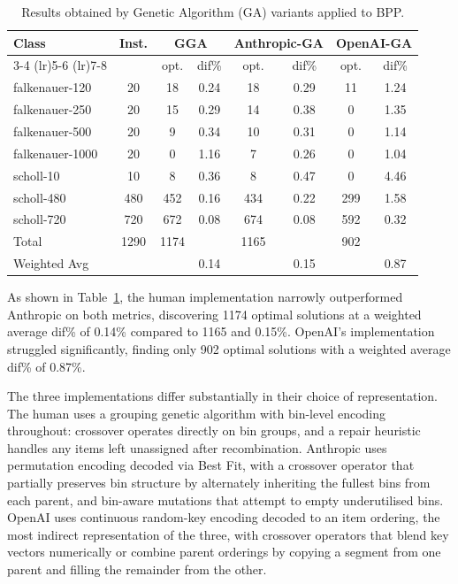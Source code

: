 \documentclass[11pt]{article}
\begin{document}
\begin{table}[H]
\centering
\caption{Results obtained by Genetic Algorithm (GA) variants applied to BPP.}
\label{tab:ga-comparison}
\begin{tabular}{l c cc cc cc}
\toprule
\multirow{2}{*}{Class} & \multirow{2}{*}{Inst.} & \multicolumn{2}{c}{GGA} & \multicolumn{2}{c}{Anthropic-GA} & \multicolumn{2}{c}{OpenAI-GA} \\
\cmidrule(lr){3-4} \cmidrule(lr){5-6} \cmidrule(lr){7-8}
 & & opt. & dif\% & opt. & dif\% & opt. & dif\% \\
\midrule
falkenauer-120  & 20   & 18   & 0.24 & 18   & 0.29 & 11   & 1.24 \\
falkenauer-250  & 20   & 15   & 0.29 & 14   & 0.38 & 0    & 1.35 \\
falkenauer-500  & 20   & 9    & 0.34 & 10   & 0.31 & 0    & 1.14 \\
falkenauer-1000 & 20   & 0    & 1.16 & 7    & 0.26 & 0    & 1.04 \\
scholl-10       & 10   & 8    & 0.36 & 8    & 0.47 & 0    & 4.46 \\
scholl-480      & 480  & 452  & 0.16 & 434  & 0.22 & 299  & 1.58 \\
scholl-720      & 720  & 672  & 0.08 & 674  & 0.08 & 592  & 0.32 \\
\midrule
Total           & 1290 & 1174 &      & 1165 &      & 902  &      \\
Weighted Avg    &      &      & 0.14 &      & 0.15 &      & 0.87 \\
\bottomrule
\end{tabular}
\end{table}

As shown in Table~\ref{tab:ga-comparison}, the human implementation narrowly outperformed Anthropic on both metrics, discovering 1174 optimal solutions at a weighted average dif\% of 0.14\% compared to 1165 and 0.15\%. OpenAI's implementation struggled significantly, finding only 902 optimal solutions with a weighted average dif\% of 0.87\%.

The three implementations differ substantially in their choice of representation. The human uses a grouping genetic algorithm with bin-level encoding throughout: crossover operates directly on bin groups, and a repair heuristic handles any items left unassigned after recombination. Anthropic uses permutation encoding decoded via Best Fit, with a crossover operator that partially preserves bin structure by alternately inheriting the fullest bins from each parent, and bin-aware mutations that attempt to empty underutilised bins. OpenAI uses continuous random-key encoding decoded to an item ordering, the most indirect representation of the three, with crossover operators that blend key vectors numerically or combine parent orderings by copying a segment from one parent and filling the remainder from the other.
\end{document}
